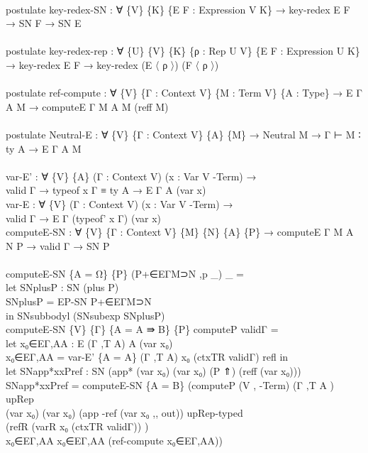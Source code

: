 {\begin{code}
{\>\<\\
\>postulate key-redex-SN : ∀ \{V\} \{K\} \{E F : Expression V K\} → key-redex E F → SN F → SN E\<\\
\>\<\\
\>postulate key-redex-rep : ∀ \{U\} \{V\} \{K\} \{ρ : Rep U V\} \{E F : Expression U K\} → key-redex E F → key-redex (E 〈 ρ 〉) (F 〈 ρ 〉)\<\\
\>\<\\
\>postulate ref-compute : ∀ \{V\} \{Γ : Context V\} \{M : Term V\} \{A : Type\} → E Γ A M → computeE Γ M A M (reff M)\<\\
\>\<\\
\>postulate Neutral-E : ∀ \{V\} \{Γ : Context V\} \{A\} \{M\} → Neutral M → Γ ⊢ M ∶ ty A → E Γ A M\<\\
\>\<\\
\>var-E' : ∀ \{V\} \{A\} (Γ : Context V) (x : Var V -Term) → \<\\
\>  valid Γ → typeof x Γ ≡ ty A → E Γ A (var x)\<\\
\>var-E : ∀ \{V\} (Γ : Context V) (x : Var V -Term) → \<\\
\>        valid Γ → E Γ (typeof' x Γ) (var x)\<\\
\>computeE-SN : ∀ \{V\} \{Γ : Context V\} \{M\} \{N\} \{A\} \{P\} → computeE Γ M A N P → valid Γ → SN P\<\\
\>\<\\
\>computeE-SN \{A = Ω\} \{P\} (P+∈EΓM⊃N ,p \_) \_ = \<\\
\>  let SNplusP : SN (plus P)\<\\
\>      SNplusP = EP-SN P+∈EΓM⊃N \<\\
\>  in SNsubbodyl (SNsubexp SNplusP)\<\\
\>computeE-SN \{V\} \{Γ\} \{A = A ⇛ B\} \{P\} computeP validΓ =\<\\
\>  let x₀∈EΓ,AA : E (Γ ,T A) A (var x₀)\<\\
\>      x₀∈EΓ,AA = var-E' \{A = A\} (Γ ,T A) x₀ (ctxTR validΓ) refl in\<\\
\>  let SNapp*xxPref : SN (app* (var x₀) (var x₀) (P ⇑) (reff (var x₀)))\<\\
\>      SNapp*xxPref = computeE-SN \{A = B\} (computeP (V , -Term) (Γ ,T A ) upRep \<\\
\>          (var x₀) (var x₀) (app -ref (var x₀ ,, out)) upRep-typed \<\\
\>          (refR (varR x₀ (ctxTR validΓ)) )\<\\
\>          x₀∈EΓ,AA x₀∈EΓ,AA (ref-compute x₀∈EΓ,AA)) \<\\
}
\end{code}}
